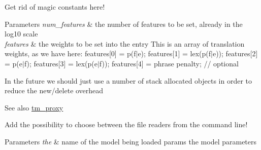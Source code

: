 \begin{DoxyRefList}
\item[\label{todo__todo000015}%
\hypertarget{todo__todo000015}{}%
Member \hyperlink{classuva_1_1smt_1_1bpbd_1_1server_1_1tm_1_1models_1_1tm__target__entry__temp_a71842af251358e437e4d1f8c98b62528}{uva\+:\+:smt\+:\+:bpbd\+:\+:server\+:\+:tm\+:\+:models\+:\+:tm\+\_\+target\+\_\+entry\+\_\+temp$<$ max\+\_\+num\+\_\+features $>$\+:\+:set\+\_\+features} (const size\+\_\+t num\+\_\+features, const prob\+\_\+weight $\ast$features)]Get rid of magic constants here! 
\begin{DoxyParams}{Parameters}
{\em num\+\_\+features} & the number of features to be set, already in the log10 scale \\
\hline
{\em features} & the weights to be set into the entry This is an array of translation weights, as we have here\+: features\mbox{[}0\mbox{]} = p(f$\vert$e); features\mbox{[}1\mbox{]} = lex(p(f$\vert$e)); features\mbox{[}2\mbox{]} = p(e$\vert$f); features\mbox{[}3\mbox{]} = lex(p(e$\vert$f)); features\mbox{[}4\mbox{]} = phrase penalty; // optional  \\
\hline
\end{DoxyParams}

\item[\label{todo__todo000016}%
\hypertarget{todo__todo000016}{}%
Member \hyperlink{classuva_1_1smt_1_1bpbd_1_1server_1_1tm_1_1proxy_1_1tm__proxy__local_af91a15abfca464b58f7e752ebc258364}{uva\+:\+:smt\+:\+:bpbd\+:\+:server\+:\+:tm\+:\+:proxy\+:\+:tm\+\_\+proxy\+\_\+local\+:\+:dispose\+\_\+query\+\_\+proxy} (\hyperlink{classuva_1_1smt_1_1bpbd_1_1server_1_1tm_1_1proxy_1_1tm__query__proxy}{tm\+\_\+query\+\_\+proxy} \&query)]In the future we should just use a number of stack allocated objects in order to reduce the new/delete overhead \begin{DoxySeeAlso}{See also}
\hyperlink{classuva_1_1smt_1_1bpbd_1_1server_1_1tm_1_1proxy_1_1tm__proxy}{tm\+\_\+proxy}  
\end{DoxySeeAlso}

\item[\label{todo__todo000017}%
\hypertarget{todo__todo000017}{}%
Member \hyperlink{classuva_1_1smt_1_1bpbd_1_1server_1_1tm_1_1proxy_1_1tm__proxy__local_ab55bb64bacfd5243dec3c683793cb7f7}{uva\+:\+:smt\+:\+:bpbd\+:\+:server\+:\+:tm\+:\+:proxy\+:\+:tm\+\_\+proxy\+\_\+local\+:\+:load\+\_\+model\+\_\+data} (char const $\ast$model\+\_\+name, const \hyperlink{structuva_1_1smt_1_1bpbd_1_1server_1_1tm_1_1tm__parameters}{tm\+\_\+parameters} \&params)]Add the possibility to choose between the file readers from the command line! 
\begin{DoxyParams}{Parameters}
{\em the} & name of the model being loaded  params the model parameters  \\
\hline
\end{DoxyParams}


\end{DoxyRefList}
